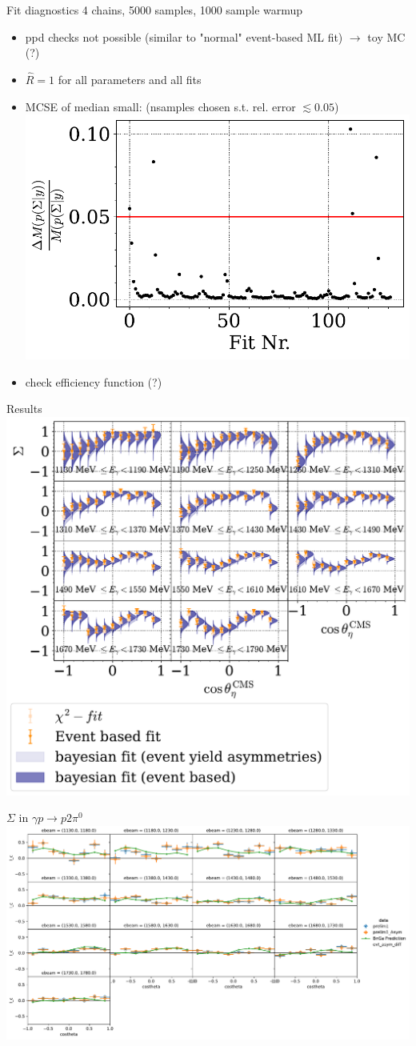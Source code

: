 \documentclass[11pt,aspectratio=169,dvipsnames]{beamer}
\begin{document}
\begin{frame}{Fit diagnostics}
	4 chains, 5000 samples, 1000 sample warmup
	\begin{itemize}


	\item ppd checks not possible (similar to "normal" event-based ML fit) $\to$ toy MC (?)
	
	\item$\hat{R}=1$ for all parameters and all fits
	
	\item MCSE of median small: (nsamples chosen s.t. rel. error $\lesssim0.05$)\\ 
	\includegraphics[width=.5\linewidth]{../../bayes/event_based_fit/mcse.pdf}
	\item check efficiency function (?)
	\end{itemize}
\end{frame}
\begin{frame}{Results}
	\centering
	\includegraphics[width=.6\linewidth]{../../bayes/event_based_fit/sigma_eta_alt.pdf}
\end{frame}


\begin{frame}{$\Sigma$ in $\gamma p \to p 2\pi^0$}
	\includegraphics[width=\linewidth]{../../figs/hydrogen/asymmetry/2pi0_prelim.pdf}
\end{frame}
\end{document}
